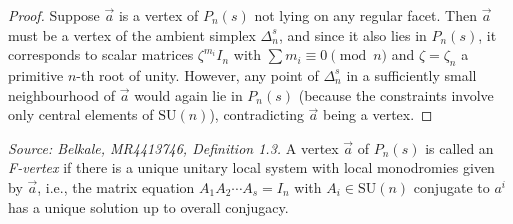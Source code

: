 \begin{proof}
  Suppose \(\vec{a}\) is a vertex of \(P_n(s)\) not lying on any regular facet. Then \(\vec{a}\) must be a vertex of the ambient simplex \(\Delta_n^s\), and since it also lies in \(P_n(s)\), it corresponds to scalar matrices \(\zeta^{m_i} I_n\) with \(\sum m_i \equiv 0 \pmod n\) and \(\zeta = \zeta_n\) a primitive \(n\)-th root of unity. However, any point of \(\Delta_n^s\) in a sufficiently small neighbourhood of \(\vec{a}\) would again lie in \(P_n(s)\) (because the constraints involve only central elements of \(\mathrm{SU}(n)\)), contradicting \(\vec{a}\) being a vertex.
\end{proof}

\begin{definition}[IsFVertex]
  \label{def:f-vertex}
  \textit{Source: Belkale, MR4413746, Definition 1.3.}
  A vertex \(\vec{a}\) of \(P_n(s)\) is called an \emph{F-vertex} if there is a unique unitary local system with local monodromies given by \(\vec{a}\), i.e., the matrix equation \(A_1 A_2 \cdots A_s = I_n\) with \(A_i \in \mathrm{SU}(n)\) conjugate to \(a^i\) has a unique solution up to overall conjugacy.
\end{definition}

